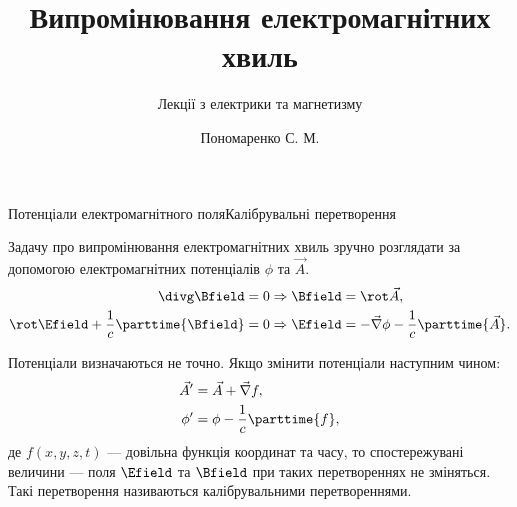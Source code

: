 \documentclass[onlytextwidth]{beamer}
\title[Лекції електрики та магнетизму]{\huge\bfseries Випромінювання електромагнітних хвиль}
\subtitle{Лекції з електрики та магнетизму}
\author{Пономаренко С. М.}
\date{}
\let\vect\vec
\begin{document}
\begin{frame}[plain]
	\maketitle
\end{frame}




\begin{frame}{Потенціали електромагнітного поля}{Калібрувальні перетворення}
\begin{block}{}\justifying
	Задачу про випромінювання електромагнітних хвиль зручно розглядати за допомогою електромагнітних потенціалів $ \phi $ та $ \vect{A} $.
	\begin{align*}
		\divg\Bfield = 0                            & \Rightarrow \Bfield = \rot\vect{A},                                     \\
		\rot\Efield + \frac1c\parttime{\Bfield} = 0 & \Rightarrow \Efield = - \vect{\nabla}\phi - \frac1c\parttime{\vect{A}}.
	\end{align*}

	Потенціали визначаються не точно. Якщо змінити потенціали наступним чином:
	\begin{align*}
		\vect{A}' & = \vect{A} + \vect{\nabla} f,  \\
		\phi'     & = \phi - \frac1c \parttime{f},
	\end{align*}
	де $ f (x,y,z,t)$ --- довільна функція координат та часу, то спостережувані величини --- поля $ \Efield $ та $ \Bfield $ при таких перетвореннях не
	зміняться. Такі перетворення називаються \alert{калібрувальними перетвореннями}.
\end{block}
\end{frame}
\end{document}
